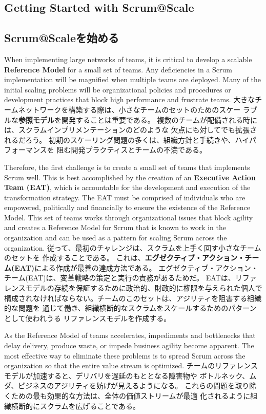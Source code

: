 \documentclass[12pt,a4paper,parskip=full]{scrartcl}
\begin{document}
\subsection{Getting Started with Scrum@Scale}
\fi
\subsection{Scrum@Scaleを始める}
When implementing large networks of teams, it is critical to develop a
scalable \textbf{Reference Model} for a small set of teams. Any
deficiencies in a Scrum implementation will be magnified when multiple
teams are deployed. Many of the initial scaling problems will be organizational 
policies and procedures or development practices that block high performance and frustrate 
teams. 
\fi
大きなチームネットワークを構築する際は、小さなチームのセットのためのスケー
ラブルな\textbf{参照モデル}を開発することは重要である。
複数のチームが配備される時には、スクラムインプリメンテーションのどのような
欠点にも対してでも拡張されるだろう。
初期のスケーリング問題の多くは、組織方針と手続きや、ハイパフォーマンスを
阻む開発プラクティスとチームの不満である。

Therefore, the first challenge is to create a small set of teams that
implements Scrum well.  This is best accomplished by the creation of an 
\textbf{Executive Action Team (EAT)}, which is accountable for the development and 
execution of the transformation strategy.  The EAT must be comprised of individuals 
who are empowered, politically and financially to ensure the existence of the
Reference Model.  This set of teams works through organizational
issues that block agility and creates a Reference Model for Scrum that is
known to work in the organization and can be used as a pattern for scaling
Scrum across the organization.
\fi
従って、最初のチャレンジは、スクラムを上手く回す小さなチームのセットを
作成することである。
これは、\textbf{エグゼクティブ・アクション・チーム(EAT)}による作成が最善の達成方法である。
エグゼクティブ・アクション・チーム(EAT)は、変革戦略の策定と実行の責務があるためだ。
EATは、リファレンスモデルの存続を保証するために政治的、財政的に権限を与えられた個人で
構成されなければならない。チームのこのセットは、アジリティを阻害する組織的な問題を
通じて働き、組織横断的なスクラムをスケールするためのパターンとして使われうる
リファレンスモデルを作成する。

As the Reference Model of teams accelerates, impediments and bottlenecks
that delay delivery, produce waste, or impede business agility become
apparent. The most effective way to eliminate these problems is to spread
Scrum across the organization so that the entire value stream is optimized.
\fi
チームのリファレンスモデルが加速すると、デリバリを遅延のもととなる障害物や
ボトルネック、ムダ、ビジネスのアジリティを妨げが見えるようになる。
これらの問題を取り除くための最も効果的な方法は、全体の価値ストリームが最適
化されるように組織横断的にスクラムを広げることである。
\end{document}
